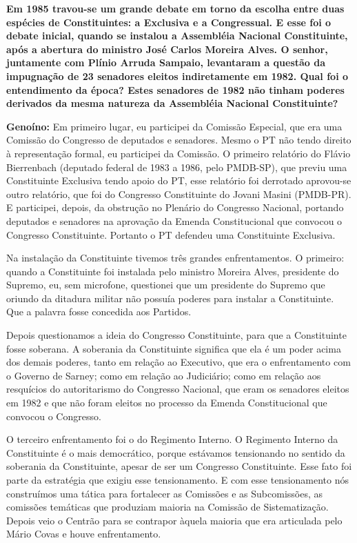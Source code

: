 \textbf{Em 1985 travou-se um grande debate em torno da escolha entre
duas espécies de Constituintes: a Exclusiva e a Congressual. E esse foi
o debate inicial, quando se instalou a Assembléia Nacional Constituinte,
após a abertura do ministro José Carlos Moreira Alves. O senhor,
juntamente com Plínio Arruda Sampaio, levantaram a questão da impugnação
de 23 senadores eleitos indiretamente em 1982. Qual foi o entendimento
da época? Estes senadores de 1982 não tinham poderes derivados da mesma
natureza da Assembléia Nacional Constituinte?}

\textbf{Genoíno:} Em primeiro lugar, eu participei da Comissão Especial,
que era uma Comissão do Congresso de deputados e senadores. Mesmo o PT
não tendo direito à representação formal, eu participei da Comissão. O
primeiro relatório do Flávio Bierrenbach (deputado federal de 1983 a
1986, pelo PMDB-SP), que previu uma Constituinte Exclusiva tendo apoio
do PT, esse relatório foi derrotado aprovou-se outro relatório, que foi
do Congresso Constituinte do Jovani Masini (PMDB-PR). E participei,
depois, da obstrução no Plenário do Congresso Nacional, portando
deputados e senadores na aprovação da Emenda Constitucional que convocou
o Congresso Constituinte. Portanto o PT defendeu uma Constituinte
Exclusiva.

Na instalação da Constituinte tivemos três grandes enfrentamentos. O
primeiro: quando a Constituinte foi instalada pelo ministro Moreira
Alves, presidente do Supremo, eu, sem microfone, questionei que um
presidente do Supremo que oriundo da ditadura militar não possuía
poderes para instalar a Constituinte. Que a palavra fosse concedida aos
Partidos.

Depois questionamos a ideia do Congresso Constituinte, para que a
Constituinte fosse soberana. A soberania da Constituinte significa que
ela é um poder acima dos demais poderes, tanto em relação ao Executivo,
que era o enfrentamento com o Governo de Sarney; como em relação ao
Judiciário; como em relação aos resquícios do autoritarismo do Congresso
Nacional, que eram os senadores eleitos em 1982 e que não foram eleitos
no processo da Emenda Constitucional que convocou o Congresso.

O terceiro enfrentamento foi o do Regimento Interno. O Regimento Interno
da Constituinte é o mais democrático, porque estávamos tensionando no
sentido da soberania da Constituinte, apesar de ser um Congresso
Constituinte. Esse fato foi parte da estratégia que exigiu esse
tensionamento. E com esse tensionamento nós construímos uma tática para
fortalecer as Comissões e as Subcomissões, as comissões temáticas que
produziam maioria na Comissão de Sistematização. Depois veio o Centrão
para se contrapor àquela maioria que era articulada pelo Mário Covas e
houve enfrentamento.

